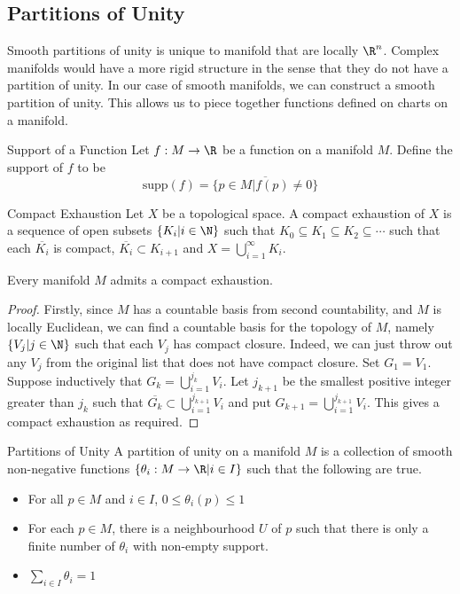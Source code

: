 \documentclass[a4paper]{article}
\begin{document}
\subsection{Partitions of Unity}
Smooth partitions of unity is unique to manifold that are locally $\R^n$. Complex manifolds would have a more rigid structure in the sense that they do not have a partition of unity. In our case of smooth manifolds, we can construct a smooth partition of unity. This allows us to piece together functions defined on charts on a manifold. 

\begin{defn}{Support of a Function}{} Let $f:M\to\R$ be a function on a manifold $M$. Define the support of $f$ to be $$\text{supp}(f)=\overline{\{p\in M|f(p)\neq 0\}}$$
\end{defn}

\begin{defn}{Compact Exhaustion}{} Let $X$ be a topological space. A compact exhaustion of $X$ is a sequence of open subsets $\{K_i|i\in\N\}$ such that $K_0\subseteq K_1\subseteq K_2\subseteq\cdots$ such that each $\overline{K_i}$ is compact, $\overline{K_i}\subset K_{i+1}$ and $X=\bigcup_{i=1}^\infty K_i$. 
\end{defn}

\begin{prp}{}{} Every manifold $M$ admits a compact exhaustion. 
\begin{proof}
Firstly, since $M$ has a countable basis from second countability, and $M$ is locally Euclidean, we can find a countable basis for the topology of $M$, namely $\{V_j|j\in\N\}$ such that each $V_j$ has compact closure. Indeed, we can just throw out any $V_j$ from the original list that does not have compact closure. Set $G_1=V_1$. Suppose inductively that $G_k=\bigcup_{i=1}^{j_k}V_i$. Let $j_{k+1}$ be the smallest positive integer greater than $j_k$ such that $\overline{G_k}\subset\bigcup_{i=1}^{j_{k+1}}V_i$ and put $G_{k+1}=\bigcup_{i=1}^{j_{k+1}}V_i$. This gives a compact exhaustion as required. 
\end{proof}
\end{prp}

\begin{defn}{Partitions of Unity}{} A partition of unity on a manifold $M$ is a collection of smooth non-negative functions $\{\theta_i:M\to\R|i\in I\}$ such that the following are true. 
\begin{itemize}
\item For all $p\in M$ and $i\in I$, $0\leq\theta_i(p)\leq 1$
\item For each $p\in M$, there is a neighbourhood $U$ of $p$ such that there is only a finite number of $\theta_i$ with non-empty support. 
\item $\sum_{i\in I}\theta_i=1$
\end{itemize}
\end{defn}
\end{document}
